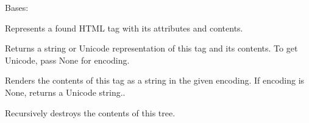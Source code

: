 \documentclass[letterpaper,10pt,english]{sphinxmanual}
\begin{document}

\begin{fulllineitems}
\label{SamPy.parsing:SamPy.parsing.BeautifulSoup.Tag}
Bases: {\hyperref[SamPy.parsing:SamPy.parsing.BeautifulSoup.PageElement]{}}

Represents a found HTML tag with its attributes and contents.


\begin{fulllineitems}
\label{SamPy.parsing:SamPy.parsing.BeautifulSoup.Tag.childGenerator}
\end{fulllineitems}



\begin{fulllineitems}
\label{SamPy.parsing:SamPy.parsing.BeautifulSoup.Tag.decode}
Returns a string or Unicode representation of this tag and
its contents. To get Unicode, pass None for encoding.

\end{fulllineitems}



\begin{fulllineitems}
\label{SamPy.parsing:SamPy.parsing.BeautifulSoup.Tag.decodeContents}
Renders the contents of this tag as a string in the given
encoding. If encoding is None, returns a Unicode string..

\end{fulllineitems}



\begin{fulllineitems}
\label{SamPy.parsing:SamPy.parsing.BeautifulSoup.Tag.decompose}
Recursively destroys the contents of this tree.


\end{fulllineitems}
\end{fulllineitems}
\end{document}
